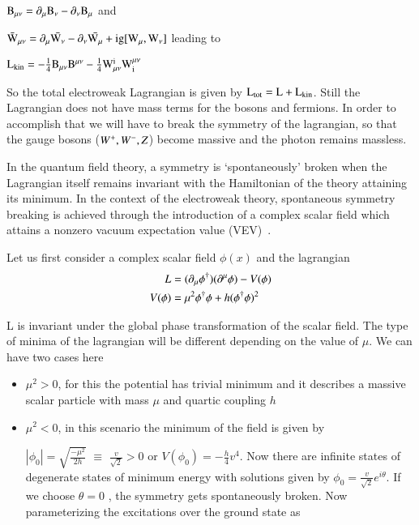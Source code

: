 $\rm B_{\mu\nu} = \partial_{\mu}B_{\nu} - \partial_{\nu}B_{\mu}$  and

$\rm \bar{W}_{\mu\nu} = \partial_{\mu}\bar{W_{\nu}} - \partial_{\nu}\bar{W_{\mu}} + ig[W_{\mu},W_{\nu}]$ leading to 

$\rm L_{kin} = - \frac{1}{4}B_{\mu\nu}B^{\mu\nu} - \frac{1}{4}W_{\mu\nu}^{i}W^{\mu\nu}_{i}$

So the total electroweak Lagrangian is given by
$\rm L_{tot} = L + L_{kin}$. Still the Lagrangian does not have mass terms for the bosons and fermions. In order to accomplish that we will have to break the symmetry of the lagrangian, so that the gauge bosons ($\it W^{+}, W^{-}, Z$) become massive and the photon remains massless.    

In the quantum field theory, a symmetry is `spontaneously' broken when the Lagrangian itself remains invariant with the Hamiltonian of the theory attaining its minimum. In the context of the electroweak theory, spontaneous symmetry breaking is achieved through the introduction of a complex scalar field which attains a nonzero vacuum expectation value (VEV)~\cite{higgs}.

Let us first consider a complex scalar field $\phi(x)$ and the  lagrangian  
\begin{align}\label{Lagra}
\it L & = (\partial_{\mu}\phi^{\dagger})(\partial^{\mu}\phi) - V(\phi)  \\
V(\phi) & = \mu^{2}\phi^{\dagger}\phi + h(\phi^{\dagger}\phi)^{2}
\end{align}

L is invariant under the global phase transformation of the scalar field. The type of minima of the lagrangian will be different depending on the value of $\mu$. We can have two cases here 
\begin{itemize}
\item $\mu^{2} > 0$, for this the potential has trivial minimum and it describes a massive scalar particle with mass $\mu$ and quartic coupling $h$

\item $\mu^{2} < 0$, in this scenario the minimum of the field is given by  

$|\phi_{0}| = \sqrt{\frac{-\mu^{2}}{2h}}$ $\equiv$ $\frac{v}{\sqrt{2}} > 0$  or $V(\phi_{0}) = -\frac{h}{4}v^{4}$.  Now there are infinite states of degenerate states of minimum energy with solutions given by $\phi_{0} = \frac{v}{\sqrt{2}} e^{i\theta}$. If we choose $\theta =0$ , the symmetry gets spontaneously broken. Now parameterizing the excitations over the ground state as

\end{itemize}

